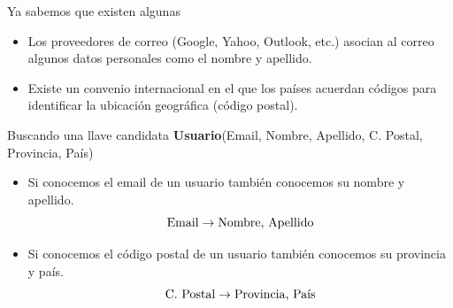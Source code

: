 \begin{frame}{Ya sabemos que existen algunas}
    \begin{itemize}
        \item Los proveedores de correo (Google, Yahoo, Outlook, etc.) asocian al
        correo algunos datos personales como el nombre y apellido.
        \item Existe un convenio internacional en el que los pa\'ises acuerdan c\'odigos para
        identificar la ubicaci\'on geogr\'afica (c\'odigo postal).
    \end{itemize}
    \vspace{5mm}


\end{frame}


\begin{frame}{Buscando una llave candidata}
    \centering
    \textbf{Usuario}(Email, Nombre, Apellido, C. Postal, Provincia, Pa\'is)
    \vspace{5mm}
    
    \begin{itemize}
        \item<2->  Si conocemos el email de un usuario tambi\'en conocemos su nombre y apellido.
        $$
        \textnormal{Email} \to \textnormal{Nombre, Apellido}
        $$
        \item<3->  Si conocemos el c\'odigo postal de un usuario tambi\'en conocemos su provincia y pa\'is.
        $$
        \textnormal{C. Postal} \to \textnormal{Provincia, Pa\'is}
        $$
    \end{itemize}
    \vspace{5mm}
    
\end{frame}

